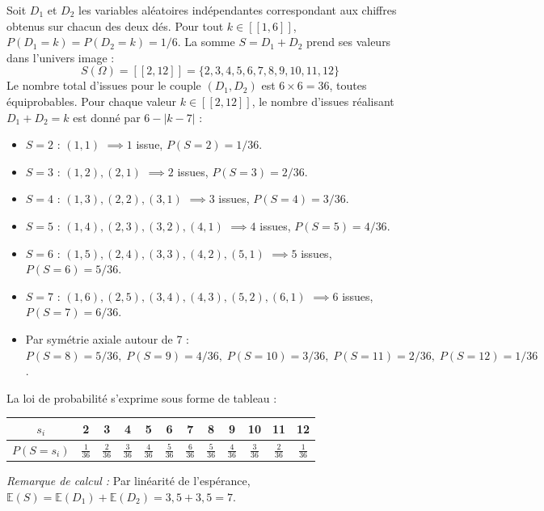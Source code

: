 \documentclass[11pt,a4paper]{article}
\newcommand{\E}{\mathbb{E}}
\begin{document}
\begin{correctionbox}
Soit $D_1$ et $D_2$ les variables aléatoires indépendantes correspondant aux chiffres obtenus sur chacun des deux dés.
Pour tout $k \in [\![1, 6]\!]$, $P(D_1 = k) = P(D_2 = k) = 1/6$.
La somme $S = D_1 + D_2$ prend ses valeurs dans l'univers image :
\[
S(\Omega) = [\![2, 12]\!] = \{2, 3, 4, 5, 6, 7, 8, 9, 10, 11, 12\}
\]
Le nombre total d'issues pour le couple $(D_1, D_2)$ est $6 \times 6 = 36$, toutes équiprobables.
Pour chaque valeur $k \in [\![2, 12]\!]$, le nombre d'issues réalisant $D_1 + D_2 = k$ est donné par $6 - |k - 7|$ :
\begin{itemize}[label=$\bullet$]
    \item $S = 2$ : $(1, 1)$ $\implies 1$ issue, $P(S=2) = 1/36$.
    \item $S = 3$ : $(1, 2), (2, 1)$ $\implies 2$ issues, $P(S=3) = 2/36$.
    \item $S = 4$ : $(1, 3), (2, 2), (3, 1)$ $\implies 3$ issues, $P(S=4) = 3/36$.
    \item $S = 5$ : $(1, 4), (2, 3), (3, 2), (4, 1)$ $\implies 4$ issues, $P(S=5) = 4/36$.
    \item $S = 6$ : $(1, 5), (2, 4), (3, 3), (4, 2), (5, 1)$ $\implies 5$ issues, $P(S=6) = 5/36$.
    \item $S = 7$ : $(1, 6), (2, 5), (3, 4), (4, 3), (5, 2), (6, 1)$ $\implies 6$ issues, $P(S=7) = 6/36$.
    \item Par symétrie axiale autour de 7 :
    $P(S=8) = 5/36, \; P(S=9) = 4/36, \; P(S=10) = 3/36, \; P(S=11) = 2/36, \; P(S=12) = 1/36$.
\end{itemize}

La loi de probabilité s'exprime sous forme de tableau :
\begin{center}
\renewcommand{\arraystretch}{1.4}
\begin{tabular}{|c|c|c|c|c|c|c|c|c|c|c|c|}
    \hline
    $s_i$ & 2 & 3 & 4 & 5 & 6 & 7 & 8 & 9 & 10 & 11 & 12 \\
    \hline
    $P(S = s_i)$ & $\frac{1}{36}$ & $\frac{2}{36}$ & $\frac{3}{36}$ & $\frac{4}{36}$ & $\frac{5}{36}$ & $\frac{6}{36}$ & $\frac{5}{36}$ & $\frac{4}{36}$ & $\frac{3}{36}$ & $\frac{2}{36}$ & $\frac{1}{36}$ \\
    \hline
\end{tabular}
\end{center}
\emph{Remarque de calcul :} Par linéarité de l'espérance, $\E(S) = \E(D_1) + \E(D_2) = 3{,}5 + 3{,}5 = 7$.
\end{correctionbox}
\end{document}
